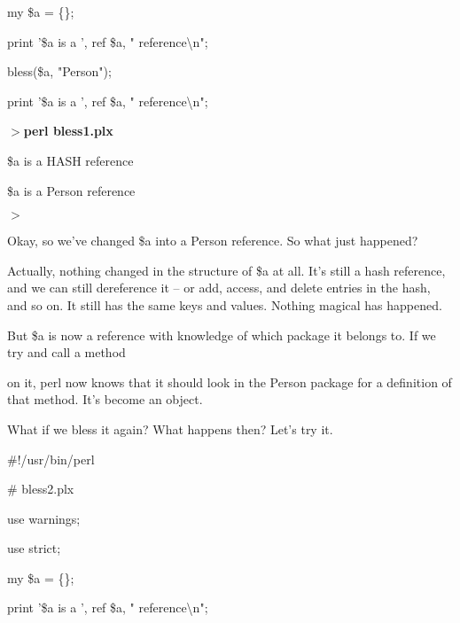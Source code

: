 \documentclass[a4paper,11pt]{book}
\begin{document}
\noindent 

\noindent my \$a = \{\};

\noindent 

\noindent print '\$a is a ', ref \$a, " reference\textbackslash n";

\noindent 

\noindent bless(\$a, "Person");

\noindent 

\noindent print '\$a is a ', ref \$a, " reference\textbackslash n";

\noindent 

\noindent $>$\textbf{perl bless1.plx}

\noindent \$a is a HASH reference

\noindent \$a is a Person reference

\noindent $>$

\noindent 

\noindent Okay, so we've changed \$a into a Person reference. So what just happened?

\noindent 

\noindent Actually, nothing changed in the structure of \$a at all. It's still a hash reference, and we can still dereference it -- or add, access, and delete entries in the hash, and so on. It still has the same keys and values. Nothing magical has happened.

\noindent 

\noindent But \$a is now a reference with knowledge of which package it belongs to. If we try and call a method

\noindent on it, perl now knows that it should look in the Person package for a definition of that method. It's become an object.

\noindent 

\noindent What if we bless it again? What happens then? Let's try it.

\noindent 

\noindent 

\noindent \#!/usr/bin/perl

\noindent \# bless2.plx

\noindent use warnings;

\noindent use strict;

\noindent 

\noindent my \$a = \{\};

\noindent 

\noindent 

\noindent print '\$a is a ', ref \$a, " reference\textbackslash n";
\end{document}
